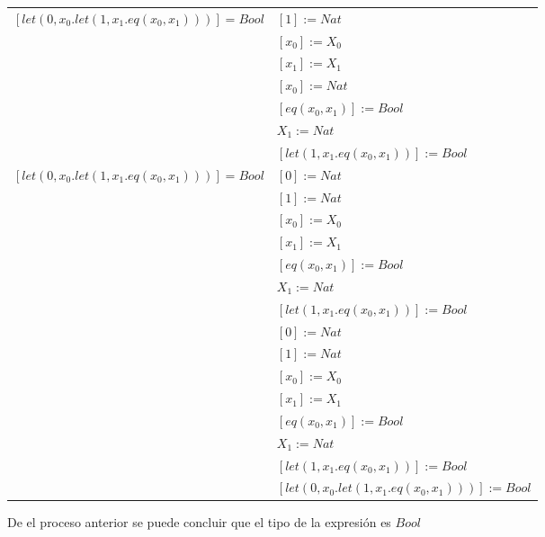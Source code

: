 \begin{exercise}
\begin{description}
\begin{center}
\begin{longtable}{ | l | l | }
                        $[let(0,x_0.let(1,x_1.eq(x_0,x_1)))] = Bool$ & $[1] := Nat$ \\
                        &  $[x_0] := X_0$   \\
                        & $[x_1] := X_1$  \\
                        & $[x_0] := Nat$  \\
                        & $[eq(x_0,x_1)] := Bool$  \\
                        & $X_1 := Nat$\\
                        & $[let(1,x_1.eq(x_0,x_1))] := Bool$ \\
                      \hline
                        $[let(0,x_0.let(1,x_1.eq(x_0,x_1)))] = Bool$ & $[0] := Nat$ \\
                        & $[1] := Nat$ \\
                        & $[x_0] := X_0$ \\
                        & $[x_1] := X_1$ \\
                        & $[eq(x_0,x_1)] := Bool$ \\
                        & $X_1 := Nat$ \\
                        & $[let(1,x_1.eq(x_0,x_1))] := Bool$ \\
                      \hline
                        & $[0] := Nat$ \\
                        & $[1] := Nat$  \\
                        & $[x_0] := X_0$ \\
                        & $[x_1] := X_1$ \\
                        & $[eq(x_0,x_1)] := Bool$ \\
                        & $X_1 := Nat$ \\
                        & $[let(1,x_1.eq(x_0,x_1))] := Bool$ \\
                        & $[let(0,x_0.let(1,x_1.eq(x_0,x_1)))] := Bool$ \\
		\hline
                    \end{longtable}
                \end{center}
        De el proceso anterior se puede concluir que el tipo de la expresión es $Bool$
        \end{description}
    \end{exercise}

\newpage

